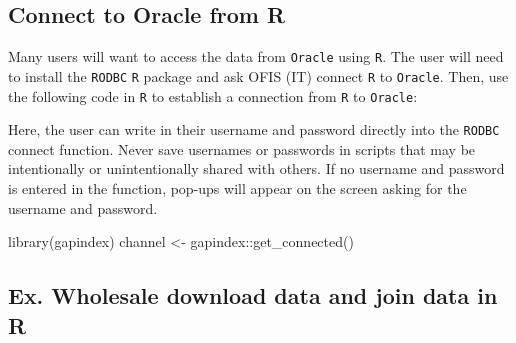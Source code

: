 \documentclass[
  letterpaper,
  oneside,
  open=any]{scrbook}
\newenvironment{Shaded}{\begin{snugshade}}{\end{snugshade}}
\newcommand{\FunctionTok}[1]{\textcolor[rgb]{0.28,0.35,0.67}{#1}}
\newcommand{\NormalTok}[1]{\textcolor[rgb]{0.00,0.23,0.31}{#1}}
\newcommand{\OtherTok}[1]{\textcolor[rgb]{0.00,0.23,0.31}{#1}}
\newcommand{\SpecialCharTok}[1]{\textcolor[rgb]{0.37,0.37,0.37}{#1}}
\begin{document}
\subsection{Connect to Oracle from R}\label{connect-to-oracle-from-r-1}

Many users will want to access the data from \texttt{Oracle} using
\texttt{R}. The user will need to install the \texttt{RODBC} \texttt{R}
package and ask OFIS (IT) connect \texttt{R} to \texttt{Oracle}. Then,
use the following code in \texttt{R} to establish a connection from
\texttt{R} to \texttt{Oracle}:

Here, the user can write in their username and password directly into
the \texttt{RODBC} connect function. Never save usernames or passwords
in scripts that may be intentionally or unintentionally shared with
others. If no username and password is entered in the function, pop-ups
will appear on the screen asking for the username and password.

\begin{Shaded}
\begin{Highlighting}[]
\FunctionTok{library}\NormalTok{(gapindex)}
\NormalTok{channel }\OtherTok{\textless{}{-}}\NormalTok{ gapindex}\SpecialCharTok{::}\FunctionTok{get\_connected}\NormalTok{()}
\end{Highlighting}
\end{Shaded}

\subsection{Ex. Wholesale download data and join data in
R}\label{ex.-wholesale-download-data-and-join-data-in-r}
\end{document}
